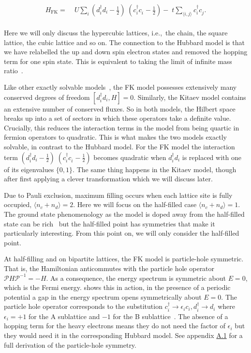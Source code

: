\[\begin{aligned}
H_{\mathrm{FK}} = & \;U \sum_{i} (d^\dagger_{i}d_{i} - \tfrac{1}{2})\;(c^\dagger_{i}c^{\phantom{\dagger}}_{i} - \tfrac{1}{2}) -\;t \sum_{\langle i,j\rangle} c^\dagger_{i}c^{\phantom{\dagger}}_{j}.\\ 
\end{aligned}\]

Here we will only discuss the hypercubic lattices, i.e.,~the chain, the square lattice, the cubic lattice and so on. The connection to the Hubbard model is that we have relabelled the up and down spin electron states and removed the hopping term for one spin state. This is equivalent to taking the limit of infinite mass ratio~\autocite{devriesSimplifiedHubbardModel1993}.

Like other exactly solvable models~\autocite{smithDisorderFreeLocalization2017}, the FK model possesses extensively many conserved degrees of freedom \([d^\dagger_{i}d_{i}, H] = 0\). Similarly, the Kitaev model contains an extensive number of conserved fluxes. So in both models, the Hilbert space breaks up into a set of sectors in which these operators take a definite value. Crucially, this reduces the interaction terms in the model from being quartic in fermion operators to quadratic. This is what makes the two models exactly solvable, in contrast to the Hubbard model. For the FK model the interaction term \((d^\dagger_{i}d_{i} - \tfrac{1}{2})\;(c^\dagger_{i}c^{\phantom{\dagger}}_{i} - \tfrac{1}{2})\) becomes quadratic when \(d^\dagger_{i}d_{i}\) is replaced with one of its eigenvalues \(\{0,1\}\). The same thing happens in the Kitaev model, though after first applying a clever transformation which we will discuss later.

Due to Pauli exclusion, maximum filling occurs when each lattice site is fully occupied, \(\langle n_c + n_d \rangle = 2\). Here we will focus on the half-filled case \(\langle n_c + n_d \rangle = 1\). The ground state phenomenology as the model is doped away from the half-filled state can be rich~\autocite{jedrzejewskiFalicovKimballModels2001,gruberGroundStatesSpinless1990} but the half-filled point has symmetries that make it particularly interesting. From this point on, we will only consider the half-filled point.

At half-filling and on bipartite lattices, the FK model is particle-hole symmetric. That is, the Hamiltonian anticommutes with the particle hole operator \(\mathcal{P}H\mathcal{P}^{-1} = -H\). As a consequence, the energy spectrum is symmetric about \(E = 0\), which is the Fermi energy.  shows this in action, in the presence of a periodic potential a gap in the energy spectrum opens symmetrically about \(E = 0\). The particle hole operator corresponds to the substitution \(c^\dagger_i \rightarrow \epsilon_i c_i, d^\dagger_i \rightarrow d_i\) where \(\epsilon_i = +1\) for the A sublattice and \(-1\) for the B sublattice~\autocite{gruberFalicovKimballModel2006}. The absence of a hopping term for the heavy electrons means they do not need the factor of \(\epsilon_i\) but they would need it in the corresponding Hubbard model. See appendix \protect\hyperlink{particle-hole-symmetry}{A.1} for a full derivation of the particle-hole symmetry.

